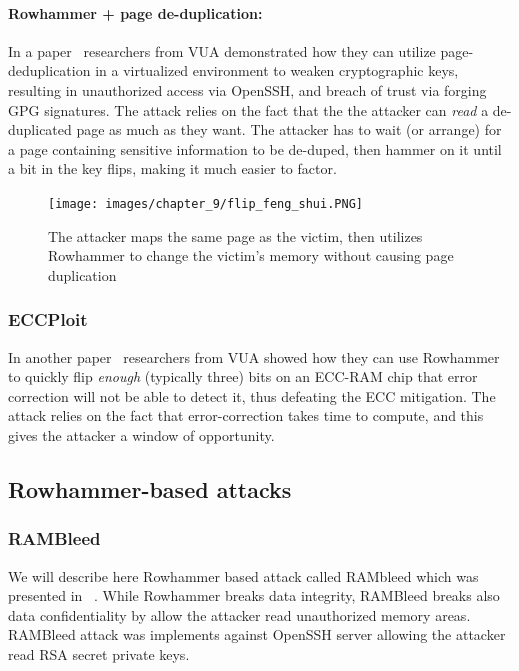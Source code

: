 \paragraph{Rowhammer + page de-duplication:}
In a paper~\cite{ffs} researchers from VUA demonstrated how they can utilize
page-deduplication in a virtualized environment to weaken cryptographic keys,
resulting in unauthorized access via OpenSSH, and breach of trust via forging
GPG signatures. The attack relies on the fact that the the attacker can
\emph{read} a de-duplicated page as much as they want. The attacker has to wait
(or arrange) for a page containing sensitive information to be de-duped, then
hammer on it until a bit in the key flips, making it much easier to factor.
\begin{figure}[!ht]
	\centering
	\texttt{[image: images/chapter\_9/flip\_feng\_shui.PNG]}
	\caption{The attacker maps the same page as the victim, then utilizes Rowhammer to change the victim's memory without causing page duplication}
	\label{fig:flip_feng_shui}
\end{figure}

\subsubsection{ECCPloit}\label{subsubsec:eccploit}
In another paper~\cite{eccploit} researchers from VUA showed how they can use
Rowhammer to quickly flip \emph{enough} (typically three) bits on an ECC-RAM
chip that error correction will not be able to detect it, thus defeating the ECC
mitigation. The attack relies on the fact that error-correction takes time to
compute, and this gives the attacker a window of opportunity.

\subsection{Rowhammer-based attacks}
\subsubsection{RAMBleed}
We will describe here Rowhammer based attack called RAMbleed which was presented in ~\cite{rambleed_paper}. While Rowhammer breaks data integrity, RAMBleed breaks also data confidentiality by allow the attacker read unauthorized memory areas. RAMBleed attack was implements against OpenSSH server allowing the attacker read RSA secret private keys. 

